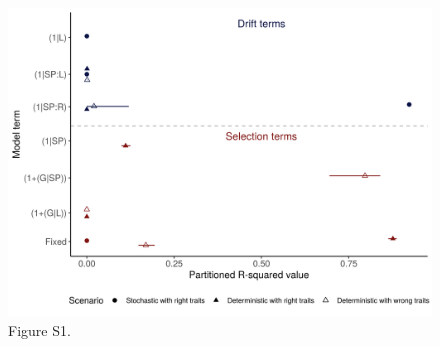 \begin{figure}
\centering
\includegraphics[scale=.9]{fig/S1.png}
\caption{Figure S1.}\label{fig:r2}
\end{figure}


